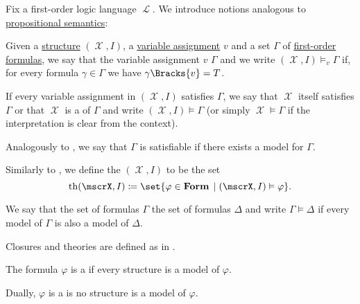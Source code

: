 \begin{definition}\label{def:first_order_semantics}
  Fix a first-order logic language \( \mscrL \). We introduce notions analogous to \hyperref[def:propositional_semantics]{propositional semantics}:
  \begin{thmenum}
     Given a \hyperref[def:first_order_structure]{structure} \( (\mscrX, I) \), a \hyperref[def:first_order_valuation/variable_assignment]{variable assignment} \( v \) and a set \( \Gamma \) of \hyperref[def:first_order_syntax/formula]{first-order formulas}, we say that the variable assignment \( v \)  \( \Gamma \) and we write \( (\mscrX, I) \vDash_v \Gamma \) if, for every formula \( \gamma \in \Gamma \) we have \( \gamma\Bracks{v} = T \).

    If every variable assignment in \( (\mscrX, I) \) satisfies \( \Gamma \), we say that \( \mscrX \) itself satisfies \( \Gamma \) or that \( \mscrX \) is a  of \( \Gamma \) and write \( (\mscrX, I) \vDash \Gamma \) (or simply \( \mscrX \vDash \Gamma \) if the interpretation is clear from the context).

    Analogously to , we say that \( \Gamma \) is satisfiable if there exists a model for \( \Gamma \).

     Similarly to , we define the  \( (\mscrX, I) \) to be the set
    \begin{equation*}
      \op{th}(\mscrX, I) \coloneqq \set{ \varphi \in \boldop{Form} \given (\mscrX, I) \vDash \varphi }.
    \end{equation*}

     We say that the set of formulas \( \Gamma \)  the set of formulas \( \Delta \) and write \( \Gamma \vDash \Delta \) if every model of \( \Gamma \) is also a model of \( \Delta \).

     Closures and theories are defined as in .

     The formula \( \varphi \) is a  if every structure is a model of \( \varphi \).

     Dually, \( \varphi \) is a  is no structure is a model of \( \varphi \).


\end{thmenum}
\end{definition}
